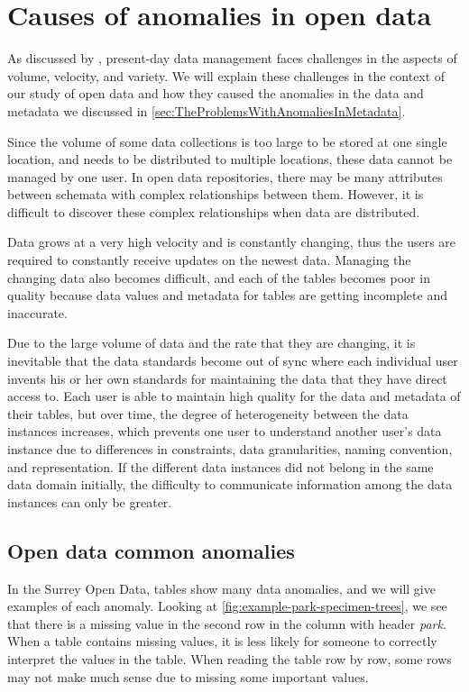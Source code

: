 \section{Causes of anomalies in open data}
\label{sec:CausesOfAnomaliesInOpenData}

As discussed by \cite{10.1145/2845915}, present-day data management faces challenges in the aspects of volume, velocity, and variety. We will explain these challenges in the context of our study of open data and how they caused the anomalies in the data and metadata we discussed in \autoref{sec:TheProblemsWithAnomaliesInMetadata}.

Since the volume of some data collections is too large to be stored at one single location, and needs to be distributed to multiple locations, these data cannot be managed by one user. In open data repositories, there may be many attributes between schemata with complex relationships between them. However, it is difficult to discover these complex relationships when data are distributed.

Data grows at a very high velocity and is constantly changing, thus the users are required to constantly receive updates on the newest data. Managing the changing data also becomes difficult, and each of the tables becomes poor in quality because data values and metadata for tables are getting incomplete and inaccurate.

Due to the large volume of data and the rate that they are changing, it is inevitable that the data standards become out of sync where each individual user invents his or her own standards for maintaining the data that they have direct access to. Each user is able to maintain high quality for the data and metadata of their tables, but over time, the degree of heterogeneity between the data instances increases, which prevents one user to understand another user's data instance due to differences in constraints, data granularities, naming convention, and representation. If the different data instances did not belong in the same data domain initially, the difficulty to communicate information among the data instances can only be greater.

\subsection{Open data common anomalies}

In the Surrey Open Data, tables show many data anomalies, and we will give examples of each anomaly. Looking at \autoref{fig:example-park-specimen-trees}, we see that there is a missing value in the second row in the column with header \textit{park}. When a table contains missing values, it is less likely for someone to correctly interpret the values in the table. When reading the table row by row, some rows may not make much sense due to missing some important values.

